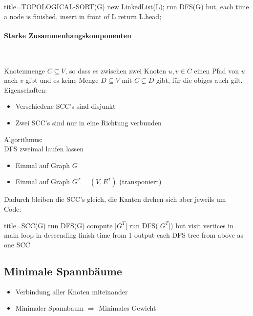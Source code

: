 \documentclass[
    ngerman,
    color=3b,
    dark_mode,
    load_common, %
    summary,
    boxarc,
]{rubos-tuda-template}
\begin{document}
\begin{codeBlock}[autogobble]{title={TOPOLOGICAL-SORT(G)}}
    new LinkedList(L);
    run DFS(G) but, each time a node is finished, insert in front of L
    return L.head;
\end{codeBlock}

\paragraph{Starke Zusammenhangskomponenten}\mbox{}\vspace{-1em}\\
\begin{wrapfigure}[5]{r}{6cm}
    \centering
    \texttt{[image: pictures/scc\\IfDarkModeT\{\_dark]}.PNG}
    \captionof{figure}{Beispiel Starke Zusammenhangskomponenten}
\end{wrapfigure}
Knotenmenge $C \subseteq V$, so dass es zwischen zwei Knoten $u,v \in C$ einen Pfad von $u$ nach $v$ gibt und es keine Menge $D \subseteq V$ mit $C \subsetneq D$ gibt, für die obiges auch gilt.\\
Eigenschaften:
\begin{itemize}
    \item Verschiedene SCC's sind disjunkt
    \item Zwei SCC's sind nur in eine Richtung verbunden
\end{itemize}
Algorithmus:\\
DFS zweimal laufen lassen
\begin{itemize}
    \item Einmal auf Graph $G$
    \item Einmal auf Graph $G^T = (V,E^T)$ (transponiert)
\end{itemize}
Dadurch bleiben die SCC's gleich, die Kanten drehen sich aber jeweils um\vspace{2em}\\
Code:
\begin{codeBlock}[autogobble,escapeinside=||]{title={SCC(G)}}
run DFS(G)
compute |$G^T$|
run DFS(|$G^T$|) but visit vertices in main loop
    in descending finish time from 1
output each DFS tree from above as one SCC
\end{codeBlock}

\clearpage
\subsection{Minimale Spannbäume}
\begin{definition}\mbox{}
    \begin{itemize}
        \item Verbindung aller Knoten miteinander
        \item Minimaler Spannbaum $\Rightarrow$ Minimales Gewicht
    \end{itemize}
\end{definition}
\end{document}

